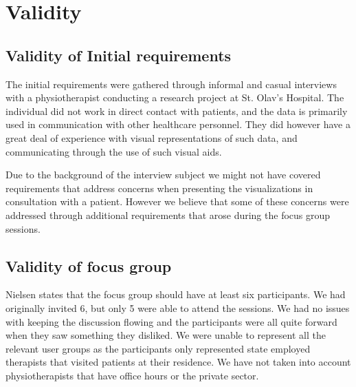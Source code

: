 \chapter{Validity}

\section{Validity of Initial requirements}
The initial requirements were gathered through informal and casual interviews with a physiotherapist conducting a research project at St. Olav's Hospital. The individual did not work in direct contact with patients, and the data is primarily used in communication with other healthcare personnel. They did however have a great deal of experience with visual representations of such data, and communicating through the use of such visual aids.

Due to the background of the interview subject we might not have covered requirements that address concerns when presenting the visualizations in consultation with a patient. However we believe that some of these concerns were addressed through additional requirements that arose during the focus group sessions.

\section{Validity of focus group}
Nielsen states that the focus group should have at least six participants. We had originally invited 6, but only 5 were able to attend the sessions. We had no issues with keeping the discussion flowing and the participants were all quite forward when they saw something they disliked. We were unable to represent all the relevant user groups as the participants only represented state employed therapists that visited patients at their residence. We have not taken into account physiotherapists that have office hours or the private sector.

